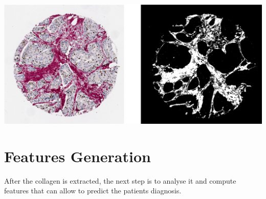 \documentclass{article}
\begin{document}
\includegraphics[width=\textwidth]{images/test.png}

\section{Features Generation}


After the collagen is extracted, the next step is to analyse it and compute
features that can allow to predict the patients diagnosis.
\end{document}
